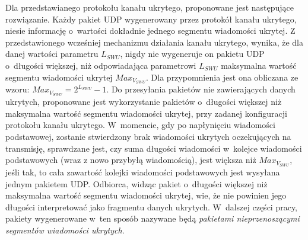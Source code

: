 \documentclass[a4paper, twoside, 12pt]{report}
\begin{document}
    Dla przedstawianego protokołu kanału ukrytego, proponowane jest następujące
    rozwiązanie. Każdy pakiet UDP wygenerowany przez protokół kanału ukrytego,
    niesie informację o~wartości dokładnie jednego segmentu wiadomości ukrytej.
    Z przedstawionego wcześniej mechanizmu
    działania kanału ukrytego, wynika, że dla danej wartości parametru \( L_{SWU} \),
    nigdy nie wygeneruje on pakietu UDP o~długości większej, niż odpowiadająca parametrowi
    \( L_{SWU} \) maksymalna wartość segmentu wiadomości ukrytej \( Max_{V_{SWU}} \).
    Dla przypomnienia jest ona obliczana ze wzoru:
    \begin{math}
        Max_{V_{SWU}} = 2^{L_{SWU}} - 1
    \end{math}.
    Do przesyłania pakietów nie zawierających danych ukrytych, proponowane jest
    wykorzystanie pakietów o~długości większej niż maksymalna wartość segmentu
    wiadomości ukrytej, przy zadanej konfiguracji protokołu kanału ukrytego. W~momencie,
    gdy po napłynięciu wiadomości podstawowej, zostanie stwierdzony brak wiadomości
    ukrytych oczekujących na transmisję, sprawdzane jest, czy suma długości wiadomości
    w~kolejce wiadomości podstawowych (wraz z nowo przybyłą wiadomością), jest
    większa niż \( Max_{V_{SWU}} \), jeśli tak, to cała zawartość kolejki wiadomości
    podstawowych jest wysyłana jednym pakietem UDP. Odbiorca, widząc pakiet o~długości
    większej niż maksymalna wartość segmentu wiadomości ukrytej, wie, że nie powinien
    jego długości interpretować jako fragmentu danych ukrytych. W~dalszej części
    pracy, pakiety wygenerowane w~ten sposób nazywane będą
    \emph{pakietami nieprzenoszącymi segmentów wiadomości ukrytych}.
\end{document}
